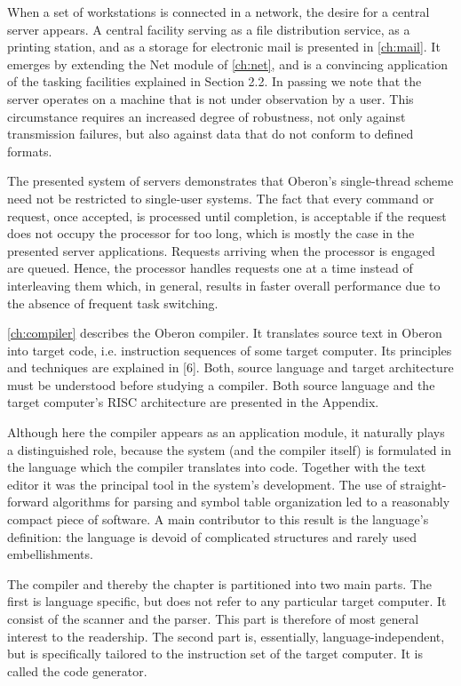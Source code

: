 When a set of workstations is connected in a network, the desire for a central server appears. A
central facility serving as a file distribution service, as a printing station, and as a storage for
electronic mail is presented in \ref{ch:mail}. It emerges by extending the Net module of \ref{ch:net},
and is a convincing application of the tasking facilities explained in Section 2.2. In passing we note
that the server operates on a machine that is not under observation by a user. This circumstance
requires an increased degree of robustness, not only against transmission failures, but also against
data that do not conform to defined formats.

The presented system of servers demonstrates that Oberon's single-thread scheme need not be
restricted to single-user systems. The fact that every command or request, once accepted, is
processed until completion, is acceptable if the request does not occupy the processor for too long,
which is mostly the case in the presented server applications. Requests arriving when the
processor is engaged are queued. Hence, the processor handles requests one at a time instead of
interleaving them which, in general, results in faster overall performance due to the absence of
frequent task switching.

\ref{ch:compiler} describes the Oberon compiler. It translates source text in Oberon into target code, i.e.
instruction sequences of some target computer. Its principles and techniques are explained in [6].
Both, source language and target architecture must be understood before studying a compiler. Both
source language and the target computer's RISC architecture are presented in the Appendix.

Although here the compiler appears as an application module, it naturally plays a distinguished role,
because the system (and the compiler itself) is formulated in the language which the compiler
translates into code. Together with the text editor it was the principal tool in the system's
development. The use of straight-forward algorithms for parsing and symbol table organization led
to a reasonably compact piece of software. A main contributor to this result is the language's
definition: the language is devoid of complicated structures and rarely used embellishments.

The compiler and thereby the chapter is partitioned into two main parts. The first is language specific,
but does not refer to any particular target computer. It consist of the scanner and the
parser. This part is therefore of most general interest to the readership. The second part is,
essentially, language-independent, but is specifically tailored to the instruction set of the target
computer. It is called the code generator.

